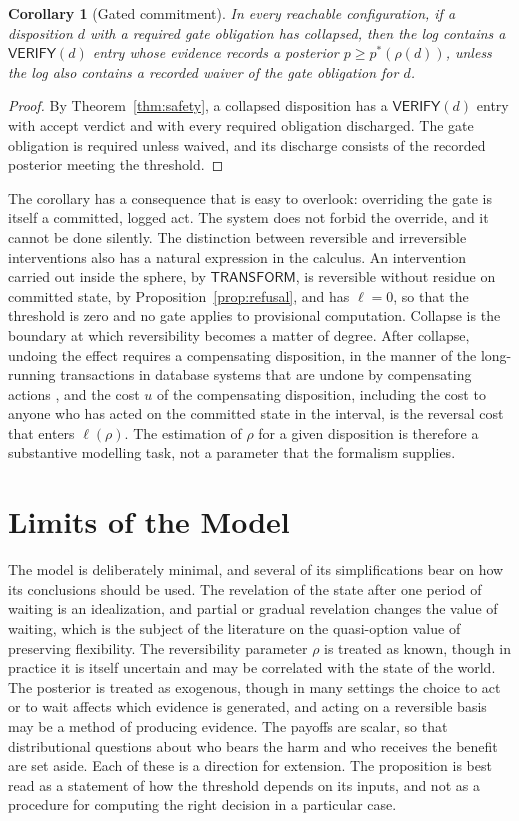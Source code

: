 \documentclass[11pt,twoside,openright]{book}
\theoremstyle{plain}
\newtheorem{corollary}[theorem]{Corollary}
\theoremstyle{definition}
\theoremstyle{remark}
\newcommand{\transform}{\mathsf{TRANSFORM}}
\newcommand{\verify}{\mathsf{VERIFY}}
\begin{document}
\begin{corollary}[Gated commitment]\label{cor:gated}
In every reachable configuration, if a disposition $d$ with a required gate obligation has collapsed, then the log contains a $\verify(d)$ entry whose evidence records a posterior $p\ge p^*(\rho(d))$, unless the log also contains a recorded waiver of the gate obligation for $d$.
\end{corollary}

\begin{proof}
By Theorem~\ref{thm:safety}, a collapsed disposition has a $\verify(d)$ entry with accept verdict and with every required obligation discharged. The gate obligation is required unless waived, and its discharge consists of the recorded posterior meeting the threshold.
\end{proof}

The corollary has a consequence that is easy to overlook: overriding the gate is itself a committed, logged act. The system does not forbid the override, and it cannot be done silently. The distinction between reversible and irreversible interventions also has a natural expression in the calculus. An intervention carried out inside the sphere, by $\transform$, is reversible without residue on committed state, by Proposition~\ref{prop:refusal}, and has $\ell=0$, so that the threshold is zero and no gate applies to provisional computation. Collapse is the boundary at which reversibility becomes a matter of degree. After collapse, undoing the effect requires a compensating disposition, in the manner of the long-running transactions in database systems that are undone by compensating actions \cite{garciamolina1987}, and the cost $u$ of the compensating disposition, including the cost to anyone who has acted on the committed state in the interval, is the reversal cost that enters $\ell(\rho)$. The estimation of $\rho$ for a given disposition is therefore a substantive modelling task, not a parameter that the formalism supplies.

\section{Limits of the Model}

The model is deliberately minimal, and several of its simplifications bear on how its conclusions should be used. The revelation of the state after one period of waiting is an idealization, and partial or gradual revelation changes the value of waiting, which is the subject of the literature on the quasi-option value of preserving flexibility. The reversibility parameter $\rho$ is treated as known, though in practice it is itself uncertain and may be correlated with the state of the world. The posterior is treated as exogenous, though in many settings the choice to act or to wait affects which evidence is generated, and acting on a reversible basis may be a method of producing evidence. The payoffs are scalar, so that distributional questions about who bears the harm and who receives the benefit are set aside. Each of these is a direction for extension. The proposition is best read as a statement of how the threshold depends on its inputs, and not as a procedure for computing the right decision in a particular case.
\end{document}
